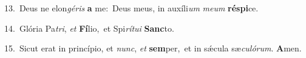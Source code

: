 {\numbfont\textcolor{\numbcolor}{13.}}~Deus ne elon\-\textit{gé}\-\textit{ris} \textbf{a} me:~\star Deus meus, in auxíli\textit{um} \textit{me}\-\textit{um} \textbf{ré}\-\textbf{spi}ce.\par
{\numbfont\textcolor{\numbcolor}{14.}}~Glória Pa\-\textit{tri}\-, \textit{et} \textbf{Fí}\-lio,~\star et Spi\-\textit{rí}\-\textit{tu}\textit{i} \textbf{Sanc}\-to.\par
{\numbfont\textcolor{\numbcolor}{15.}}~Sicut erat in princípio, et \textit{nunc}\-, \textit{et} \textbf{sem}\-per,~\star et in sǽcula sæ\-\textit{cu}\-\textit{ló}\textit{rum}. \textbf{A}\-men.\par
